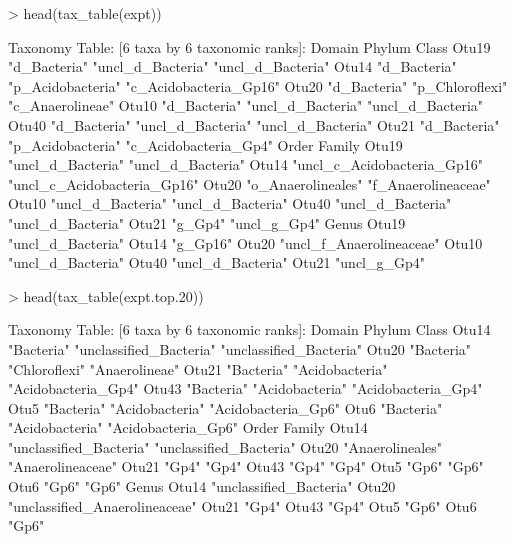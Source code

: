 \documentclass{article}
\begin{document}
\begin{Schunk}
\begin{Sinput}
> head(tax_table(expt))
\end{Sinput}
\begin{Soutput}
Taxonomy Table:     [6 taxa by 6 taxonomic ranks]:
      Domain       Phylum            Class                 
Otu19 "d_Bacteria" "uncl_d_Bacteria" "uncl_d_Bacteria"     
Otu14 "d_Bacteria" "p_Acidobacteria" "c_Acidobacteria_Gp16"
Otu20 "d_Bacteria" "p_Chloroflexi"   "c_Anaerolineae"      
Otu10 "d_Bacteria" "uncl_d_Bacteria" "uncl_d_Bacteria"     
Otu40 "d_Bacteria" "uncl_d_Bacteria" "uncl_d_Bacteria"     
Otu21 "d_Bacteria" "p_Acidobacteria" "c_Acidobacteria_Gp4" 
      Order                       Family                     
Otu19 "uncl_d_Bacteria"           "uncl_d_Bacteria"          
Otu14 "uncl_c_Acidobacteria_Gp16" "uncl_c_Acidobacteria_Gp16"
Otu20 "o_Anaerolineales"          "f_Anaerolineaceae"        
Otu10 "uncl_d_Bacteria"           "uncl_d_Bacteria"          
Otu40 "uncl_d_Bacteria"           "uncl_d_Bacteria"          
Otu21 "g_Gp4"                     "uncl_g_Gp4"               
      Genus                   
Otu19 "uncl_d_Bacteria"       
Otu14 "g_Gp16"                
Otu20 "uncl_f_Anaerolineaceae"
Otu10 "uncl_d_Bacteria"       
Otu40 "uncl_d_Bacteria"       
Otu21 "uncl_g_Gp4"            
\end{Soutput}
\begin{Sinput}
> head(tax_table(expt.top.20))
\end{Sinput}
\begin{Soutput}
Taxonomy Table:     [6 taxa by 6 taxonomic ranks]:
      Domain     Phylum                  Class                  
Otu14 "Bacteria" "unclassified_Bacteria" "unclassified_Bacteria"
Otu20 "Bacteria" "Chloroflexi"           "Anaerolineae"         
Otu21 "Bacteria" "Acidobacteria"         "Acidobacteria_Gp4"    
Otu43 "Bacteria" "Acidobacteria"         "Acidobacteria_Gp4"    
Otu5  "Bacteria" "Acidobacteria"         "Acidobacteria_Gp6"    
Otu6  "Bacteria" "Acidobacteria"         "Acidobacteria_Gp6"    
      Order                   Family                 
Otu14 "unclassified_Bacteria" "unclassified_Bacteria"
Otu20 "Anaerolineales"        "Anaerolineaceae"      
Otu21 "Gp4"                   "Gp4"                  
Otu43 "Gp4"                   "Gp4"                  
Otu5  "Gp6"                   "Gp6"                  
Otu6  "Gp6"                   "Gp6"                  
      Genus                         
Otu14 "unclassified_Bacteria"       
Otu20 "unclassified_Anaerolineaceae"
Otu21 "Gp4"                         
Otu43 "Gp4"                         
Otu5  "Gp6"                         
Otu6  "Gp6"                         
\end{Soutput}
\end{Schunk}
\end{document}
